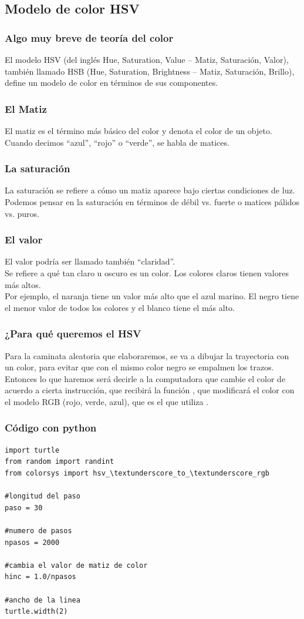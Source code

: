 \subsection*{Modelo de color HSV}
\begin{frame}
\frametitle{Algo muy breve de teoría del color}
El modelo HSV (del inglés Hue, Saturation, Value – Matiz, Saturación, Valor), también llamado HSB (Hue, Saturation, Brightness – Matiz, Saturación, Brillo), define un modelo de color en términos de sus componentes.
\end{frame}
\begin{frame}
\frametitle{El Matiz}
El matiz es el término más básico del color y denota el color de un objeto.
\\
\bigskip
Cuando decimos \enquote{azul}, \enquote{rojo} o \enquote{verde}, se habla de matices.
\end{frame}
\begin{frame}
\frametitle{La saturación}
La saturación se refiere a cómo un matiz aparece bajo ciertas condiciones de luz.
\\
\bigskip
Podemos pensar en la saturación en términos de débil vs. fuerte o matices pálidos vs. puros.     
\end{frame}
\begin{frame}
\frametitle{El valor}
El valor podría ser llamado también \enquote{claridad}.
\\
\bigskip
Se refiere a qué tan claro u oscuro es un color. Los colores claros tienen valores más altos.
\\
\bigskip
Por ejemplo, el naranja tiene un valor más alto que el azul marino. El negro tiene el menor valor de todos los colores y el blanco tiene el más alto.
\end{frame}
\begin{frame}
\frametitle{¿Para qué queremos el HSV}
Para la caminata aleatoria que elaboraremos, se va a dibujar la trayectoria con un color, para evitar que con el mismo color negro se empalmen los trazos.
\\
\bigskip
Entonces lo que haremos será decirle a la computadora que cambie el color de acuerdo a cierta instrucción, que recibirá la función , que modificará el color con el modelo RGB (rojo, verde, azul), que es el que utiliza \python{}.
    


\end{frame}
\begin{frame}
\frametitle{Código con python}
\begin{lstlisting}[caption=Definición del espacio de trabajo, style=FormattedNumber, basicstyle=\linespread{1.1}\ttfamily=\small, columns=fullflexible]
import turtle
from random import randint
from colorsys import hsv_\textunderscore_to_\textunderscore_rgb

#longitud del paso
paso = 30

#numero de pasos
npasos = 2000

#cambia el valor de matiz de color
hinc = 1.0/npasos

#ancho de la linea
turtle.width(2)
\end{lstlisting}
\end{frame}
